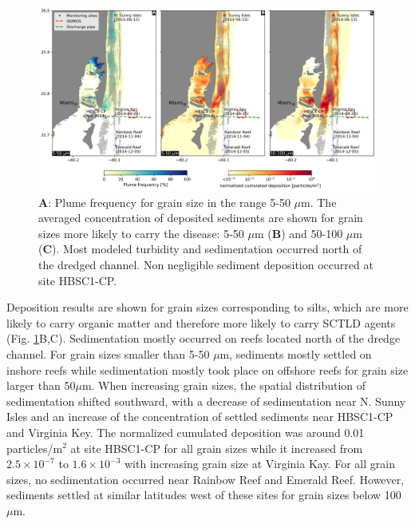 \documentclass[preprint,12pt,authoryear]{elsarticle}
\begin{document}
\begin{figure}
	\centering
	\includegraphics[width=\textwidth]{figures/deposition_plumes.png}
	\caption{\textbf{A}: Plume frequency for grain size in the range 5-50 $\mu$m. The averaged concentration of deposited sediments are shown for grain sizes more likely to carry the disease: 5-50 $\mu$m (\textbf{B}) and 50-100 $\mu$m (\textbf{C}). Most modeled turbidity and sedimentation occurred north of the dredged channel. Non negligible sediment deposition occurred at site HBSC1-CP.}
	\label{fig:onset_depo}    
\end{figure}

Deposition results are shown for grain sizes corresponding to silts, which are more likely to carry organic matter and therefore more likely to carry SCTLD agents \citep{erftemeijer2012environmental}(Fig. \ref{fig:onset_depo}B,C). Sedimentation mostly occurred on reefs located north of the dredge channel. For grain sizes smaller than 5-50 $\mu$m, sediments mostly settled on inshore reefs while sedimentation mostly took place on offshore reefs for grain size larger than 50$\mu$m. When increasing grain sizes, the spatial distribution of sedimentation shifted southward, with a decrease of sedimentation near N. Sunny Isles and an increase of the concentration of settled sediments near HBSC1-CP and Virginia Key. The normalized cumulated deposition was around 0.01 particles/m$^2$ at site HBSC1-CP for all grain sizes while it increased from $2.5\times 10^{-7}$ to $1.6\times 10^{-3}$ with increasing grain size at Virginia Kay. For all grain sizes, no sedimentation occurred near Rainbow Reef and Emerald Reef. However, sediments settled at similar latitudes west of these sites for grain sizes below 100 $\mu$m.
\end{document}
